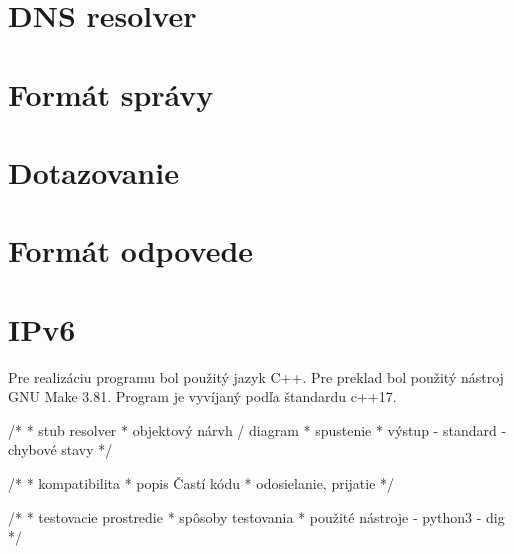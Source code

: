\section{DNS resolver}
\label{DNS resolver}






\section{Formát správy}
\label{Formát správy}


\section{Dotazovanie}
\label{Dotazovanie}


\section{Formát odpovede}

\section{IPv6}


%

Pre realizáciu programu bol použitý jazyk C++. Pre preklad bol použitý nástroj GNU Make 3.81. Program je vyvíjaný podľa štandardu c++17.

/*
 * stub resolver
 * objektový nárvh / diagram
 * spustenie
 * výstup   - standard
            - chybové stavy
 */



/*
 * kompatibilita
 * popis Častí kódu 
 * odosielanie, prijatie 
 */


/*
 * testovacie prostredie
 * spôsoby testovania
 * použité nástroje - python3
                    - dig 
 */


